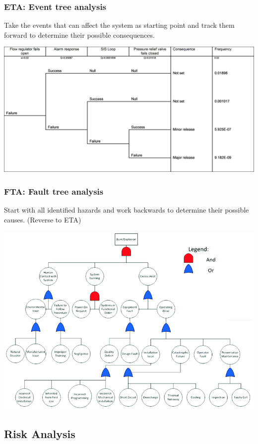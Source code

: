 \documentclass[
  10pt,
  a4paper,
  twocolumn]{article}
\begin{document}
\subsubsection{ETA: Event tree analysis}\label{eta-event-tree-analysis}

Take the events that can affect the system as starting point and track
them forward to determine their possible consequences.

\includegraphics{images/safety/image-1.png}

\subsubsection{FTA: Fault tree analysis}\label{fta-fault-tree-analysis}

Start with all identified hazards and work backwards to determine their
possible causes. (Reverse to ETA)

\includegraphics{images/safety/image-2.png}

\subsection{Risk Analysis}\label{risk-analysis}
\end{document}
